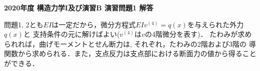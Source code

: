 \documentclass[10pt,a4j]{jarticle}
\newlength{\minitwocolumn}
\begin{document}
\newcommand{\fat}[1]{\mbox{\boldmath $#1$}}
\newcommand{\D}{\partial}
\newcommand{\w}{\omega}
\newcommand{\ga}{\alpha}
\newcommand{\gb}{\beta}
\newcommand{\gx}{\xi}
\newcommand{\gz}{\zeta}
\newcommand{\vhat}[1]{\hat{\fat{#1}}}
\newcommand{\spc}{\vspace{0.7\baselineskip}}
\newcommand{\halfspc}{\vspace{0.3\baselineskip}}

\newcommand{\twofig}[2]
 {
   \begin{figure}[h]
     \begin{minipage}[t]{\minitwocolumn}
         \begin{center}   #1
         \end{center}
     \end{minipage}
         \hspace{\columnsep}
     \begin{minipage}[t]{\minitwocolumn}
         \begin{center} #2
         \end{center}
     \end{minipage}
   \end{figure}
 }
\begin{center}
{\Large \bf 2020年度 構造力学I及び演習B 演習問題1 解答} \\
\end{center}
問題1, 2とも$EI$は一定だから，微分方程式$EIv^{(4)}=q(x)$を与えられた外力$q(x)$と
支持条件の元に解けばよい($v^{(4)}$は$v$の4階微分を表す)．
たわみが求められれば，曲げモーメントとせん断力は, それぞれ，たわみの2階および3階の
導関数から求められる．また，支点反力は支点部における断面力の値から得ることができる．
\end{document}
